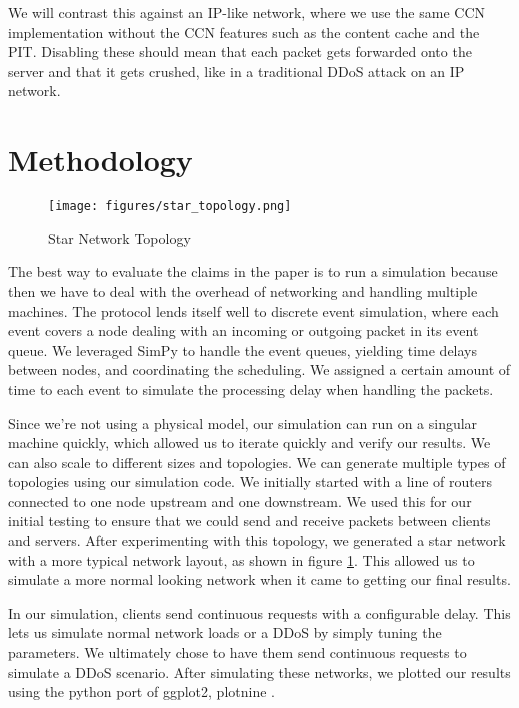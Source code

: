 \documentclass[conference,compsoc, 10pt]{IEEEtran}
\begin{document}
We will contrast this against an IP-like network, where we use the same CCN implementation without the CCN features such as the content cache and the PIT. Disabling these should mean that each packet gets forwarded onto the server and that it gets crushed, like in a traditional DDoS attack on an IP network.

\section{Methodology}

\begin{figure}[h]
\centering
\texttt{[image: figures/star\_topology.png]}
\caption{Star Network Topology\cite{star_topology}}
\label{fig:star_topology}
\end{figure}

The best way to evaluate the claims in the paper is to run a simulation because then we have to deal with the overhead of networking and handling multiple machines. The protocol lends itself well to discrete event simulation, where each event covers a node dealing with an incoming or outgoing packet in its event queue. We leveraged SimPy \cite{SimPy} to handle the event queues, yielding time delays between nodes, and coordinating the scheduling. We assigned a certain amount of time to each event to simulate the processing delay when handling the packets.

Since we're not using a physical model, our simulation can run on a singular machine quickly, which allowed us to iterate quickly and verify our results. We can also scale to different sizes and topologies. We can generate multiple types of topologies using our simulation code. We initially started with a line of routers connected to one node upstream and one downstream. We used this for our initial testing to ensure that we could send and receive packets between clients and servers. After experimenting with this topology, we generated a star network with a more typical network layout, as shown in figure \ref{fig:star_topology}. This allowed us to simulate a more normal looking network when it came to getting our final results. 

In our simulation, clients send continuous requests with a configurable delay. This lets us simulate normal network loads or a DDoS by simply tuning the parameters. We ultimately chose to have them send continuous requests to simulate a DDoS scenario. After simulating these networks, we plotted our results using the python port of ggplot2, plotnine \cite{plotnine}.
\end{document}
